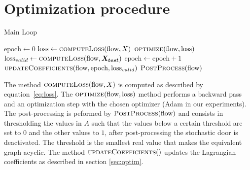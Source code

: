 \appendix
\section{Optimization procedure}\label{app:optim}
\begin{algorithm}
\begin{algorithmic} \caption{Main Loop}
\State $\text{epoch} \gets 0$
        \State $\text{loss} \gets \Call{computeLoss}{\text{flow}, X}$
        \State $\Call{optimize}{\text{flow}, \text{loss}}$
    \EndFor
   \State $\text{loss}_{valid} \gets \Call{computeLoss}{\text{flow}, \mb{X_{test}}}$
    \State $\text{epoch} \gets \text{epoch} + 1$
    \State $\Call{updateCoefficients}{\text{flow}, \text{epoch}, \text{loss}_{valid}}$
        \State $\Call{PostProcess}{\text{flow}}$
    \EndIf
\EndWhile
\end{algorithmic}
\end{algorithm}
The method $\Call{computeLoss}{\text{flow}, X}$ is computed as described by equation~\eqref{eq:loss}. The $\Call{optimize}{\text{flow}, \text{loss}}$ method performs a backward pass and an optimization step with the chosen optimizer (Adam in our experiments). The post-processing is peformed by $\Call{PostProcess}{\text{flow}}$ and consists in thresholding the values in $A$ such that the values below a certain threshold are set to $0$ and the other values to $1$, after post-processing the stochastic door is deactivated. The threshold is the smallest real value that makes the equivalent graph acyclic. The method $\Call{updateCoefficients}$ updates the Lagrangian coefficients as described in section \ref{sec:optim}.


